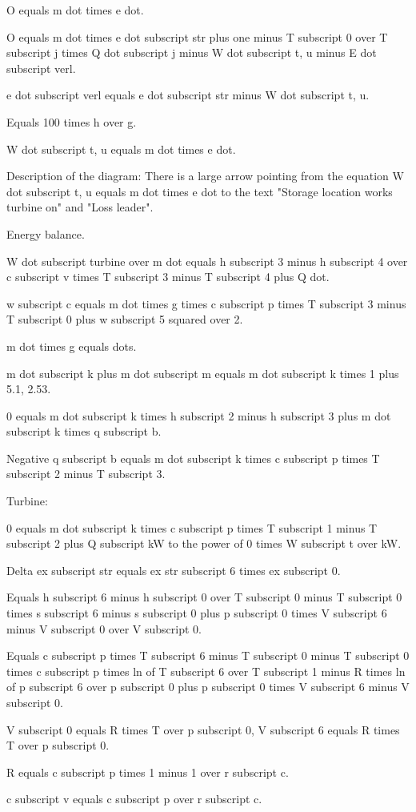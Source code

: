 O equals m dot times e dot.

O equals m dot times e dot subscript str plus one minus T subscript 0 over T subscript j times Q dot subscript j minus W dot subscript t, u minus E dot subscript verl.

e dot subscript verl equals e dot subscript str minus W dot subscript t, u.

Equals 100 times h over g.

W dot subscript t, u equals m dot times e dot.

Description of the diagram: There is a large arrow pointing from the equation W dot subscript t, u equals m dot times e dot to the text "Storage location works turbine on" and "Loss leader".

Energy balance.

W dot subscript turbine over m dot equals h subscript 3 minus h subscript 4 over c subscript v times T subscript 3 minus T subscript 4 plus Q dot.

w subscript c equals m dot times g times c subscript p times T subscript 3 minus T subscript 0 plus w subscript 5 squared over 2.

m dot times g equals dots.

m dot subscript k plus m dot subscript m equals m dot subscript k times 1 plus 5.1, 2.53.

0 equals m dot subscript k times h subscript 2 minus h subscript 3 plus m dot subscript k times q subscript b.

Negative q subscript b equals m dot subscript k times c subscript p times T subscript 2 minus T subscript 3.

Turbine:

0 equals m dot subscript k times c subscript p times T subscript 1 minus T subscript 2 plus Q subscript kW to the power of 0 times W subscript t over kW.

Delta ex subscript str equals ex str subscript 6 times ex subscript 0.

Equals h subscript 6 minus h subscript 0 over T subscript 0 minus T subscript 0 times s subscript 6 minus s subscript 0 plus p subscript 0 times V subscript 6 minus V subscript 0 over V subscript 0.

Equals c subscript p times T subscript 6 minus T subscript 0 minus T subscript 0 times c subscript p times ln of T subscript 6 over T subscript 1 minus R times ln of p subscript 6 over p subscript 0 plus p subscript 0 times V subscript 6 minus V subscript 0.

V subscript 0 equals R times T over p subscript 0, V subscript 6 equals R times T over p subscript 0.

R equals c subscript p times 1 minus 1 over r subscript c.

c subscript v equals c subscript p over r subscript c.